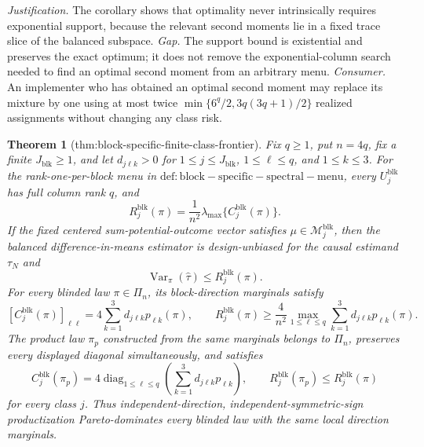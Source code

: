 \documentclass{article}
\newtheorem{theorem}{Theorem}
\begin{document}
\par\smallskip\noindent \textit{Justification.} The corollary shows that optimality never intrinsically requires exponential support, because the relevant second moments lie in a fixed trace slice of the balanced subspace. \textit{Gap.} The support bound is existential and preserves the exact optimum; it does not remove the exponential-column search needed to find an optimal second moment from an arbitrary menu. \textit{Consumer.} An implementer who has obtained an optimal second moment may replace its mixture by one using at most twice \(\min\{6^q/2,3q(3q+1)/2\}\) realized assignments without changing any class risk.

\begin{theorem}[thm:block-specific-finite-class-frontier]\label{thm:block-specific-finite-class-frontier}
Fix \(q\ge1\), put \(n=4q\), fix a finite \(J_{\mathrm{blk}}\ge1\), and let \(d_{j\ell k}>0\) for \(1\le j\le J_{\mathrm{blk}}\), \(1\le\ell\le q\), and \(1\le k\le3\). For the rank-one-per-block menu in \(\mathrm{def:block-specific-spectral-menu}\), every \(U_j^{\mathrm{blk}}\) has full column rank \(q\), and
\[
R_j^{\mathrm{blk}}(\pi)
=\frac1{n^2}\lambda_{\max}\{C_j^{\mathrm{blk}}(\pi)\}.
\]
If the fixed centered sum-potential-outcome vector satisfies \(\mu\in\mathcal M_j^{\mathrm{blk}}\), then the balanced difference-in-means estimator is design-unbiased for the causal estimand \(\tau_N\) and
\[
\operatorname{Var}_\pi(\widehat\tau)\le R_j^{\mathrm{blk}}(\pi).
\]
For every blinded law \(\pi\in\Pi_n\), its block-direction marginals satisfy
\[
[C_j^{\mathrm{blk}}(\pi)]_{\ell\ell}
=4\sum_{k=1}^3d_{j\ell k}p_{\ell k}(\pi),
\qquad
R_j^{\mathrm{blk}}(\pi)
\ge\frac4{n^2}\max_{1\le\ell\le q}
\sum_{k=1}^3d_{j\ell k}p_{\ell k}(\pi).
\]
The product law \(\pi_p\) constructed from the same marginals belongs to \(\Pi_n\), preserves every displayed diagonal simultaneously, and satisfies
\[
C_j^{\mathrm{blk}}(\pi_p)
=4\operatorname{diag}_{1\le\ell\le q}
\left(\sum_{k=1}^3d_{j\ell k}p_{\ell k}\right),
\qquad
R_j^{\mathrm{blk}}(\pi_p)\le R_j^{\mathrm{blk}}(\pi)
\]
for every class \(j\). Thus independent-direction, independent-symmetric-sign productization Pareto-dominates every blinded law with the same local direction marginals.


\end{theorem}
\end{document}
